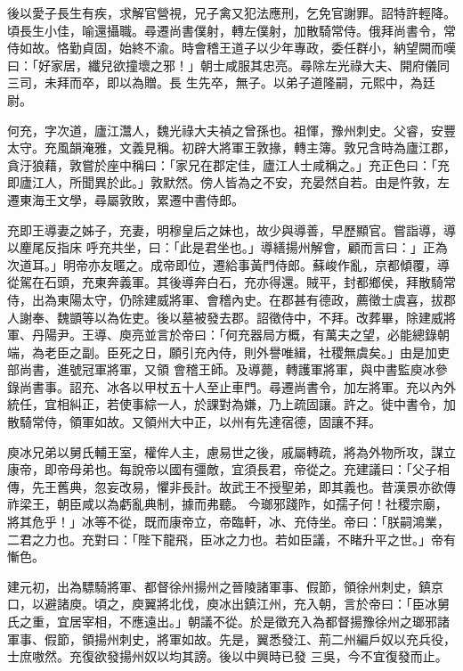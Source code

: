 \begin{pinyinscope}
 後以愛子長生有疾，求解官營視，兄子禽又犯法應刑，乞免官謝罪。詔特許輕降。頃長生小佳，喻還攝職。尋遷尚書僕射，轉左僕射，加散騎常侍。俄拜尚書令，常侍如故。恪勤貞固，始終不渝。時會稽王道子以少年專政，委任群小，納望闕而嘆曰：「好家居，纖兒欲撞壞之邪！」朝士咸服其忠亮。尋除左光祿大夫、開府儀同三司，未拜而卒，即以為贈。長
 生先卒，無子。以弟子道隆嗣，元熙中，為廷尉。



 何充，字次道，廬江灊人，魏光祿大夫禎之曾孫也。祖惲，豫州刺史。父睿，安豐太守。充風韻淹雅，文義見稱。初辟大將軍王敦掾，轉主簿。敦兄含時為廬江郡，貪汙狼藉，敦嘗於座中稱曰：「家兄在郡定佳，廬江人士咸稱之。」充正色曰：「充即廬江人，所聞異於此。」敦默然。傍人皆為之不安，充晏然自若。由是忤敦，左遷東海王文學，尋屬敦敗，累遷中書侍郎。



 充即王導妻之姊子，充妻，明穆皇后之妹也，故少與導善，早歷顯官。嘗詣導，導以麈尾反指床
 呼充共坐，曰：「此是君坐也。」導繕揚州解會，顧而言曰：」正為次道耳。」明帝亦友暱之。成帝即位，遷給事黃門侍郎。蘇峻作亂，京都傾覆，導從駕在石頭，充東奔義軍。其後導奔白石，充亦得還。賊平，封都鄉侯，拜散騎常侍，出為東陽太守，仍除建威將軍、會稽內史。在郡甚有德政，薦徵士虞喜，拔郡人謝奉、魏顗等以為佐吏。後以墓被發去郡。詔徵侍中，不拜。改葬畢，除建威將軍、丹陽尹。王導、庾亮並言於帝曰：「何充器局方概，有萬夫之望，必能總錄朝端，為老臣之副。臣死之日，願引充內侍，則外譽唯緝，社稷無虞矣。」由是加吏部尚書，進號冠軍將軍，又領
 會稽王師。及導薨，轉護軍將軍，與中書監庾冰參錄尚書事。詔充、冰各以甲杖五十人至止車門。尋遷尚書令，加左將軍。充以內外統任，宜相糾正，若使事綜一人，於課對為嫌，乃上疏固讓。許之。徙中書令，加散騎常侍，領軍如故。又領州大中正，以州有先達宿德，固讓不拜。



 庾冰兄弟以舅氏輔王室，權侔人主，慮易世之後，戚屬轉疏，將為外物所攻，謀立康帝，即帝母弟也。每說帝以國有彊敵，宜須長君，帝從之。充建議曰：「父子相傳，先王舊典，忽妄改易，懼非長計。故武王不授聖弟，即其義也。昔漢景亦欲傳祚梁王，朝臣咸以為虧亂典制，據而弗聽。
 今瑯邪踐阼，如孺子何！社稷宗廟，將其危乎！」冰等不從，既而康帝立，帝臨軒，冰、充侍坐。帝曰：「朕嗣鴻業，二君之力也。充對曰：「陛下龍飛，臣冰之力也。若如臣議，不睹升平之世。」帝有慚色。



 建元初，出為驃騎將軍、都督徐州揚州之晉陵諸軍事、假節，領徐州刺史，鎮京口，以避諸庾。頃之，庾翼將北伐，庾冰出鎮江州，充入朝，言於帝曰：「臣冰舅氏之重，宜居宰相，不應遠出。」朝議不從。於是徵充入為都督揚豫徐州之瑯邪諸軍事、假節，領揚州刺史，將軍如故。先是，翼悉發江、荊二州編戶奴以充兵役，士庶嗷然。充復欲發揚州奴以均其謗。後以中興時已發
 三吳，今不宜復發而止。




\end{pinyinscope}
